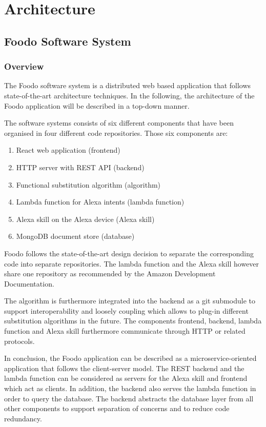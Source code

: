 \chapter{Architecture}
\section{Foodo Software System}
\subsection{Overview}
The Foodo software system is a distributed web based application that follows state-of-the-art architecture techniques. In the following, the architecture of the Foodo application will be described in a top-down manner.
 
The software systems consists of six different components that have been organised in four different code repositories. Those six components are:
\begin{enumerate}
	\itemsep-0.5em 
	\item React web application (frontend)
	\item HTTP server with REST API (backend)
	\item Functional substitution algorithm (algorithm)
	\item Lambda function for Alexa intents (lambda function)
	\item Alexa skill on the Alexa device (Alexa skill)
	\item MongoDB document store (database)
\end{enumerate}

Foodo follows the state-of-the-art design decision to separate the corresponding code into separate repositories. The lambda function and the Alexa skill however share one repository as recommended by the Amazon Development Documentation. 

The algorithm is furthermore integrated into the backend as a git submodule to support interoperability and loosely coupling which allows to plug-in different substitution algorithms in the future. The components frontend, backend, lambda function and Alexa skill furthermore communicate through HTTP or related protocols. 

In conclusion, the Foodo application can be described as a microservice-oriented application that follows the client-server model. The REST backend and the lambda function can be considered as servers for the Alexa skill and frontend which act as clients. In addition, the backend also serves the lambda function in order to query the database. The backend abstracts the database layer from all other components to support separation of concerns and to reduce code redundancy. 
\clearpage
